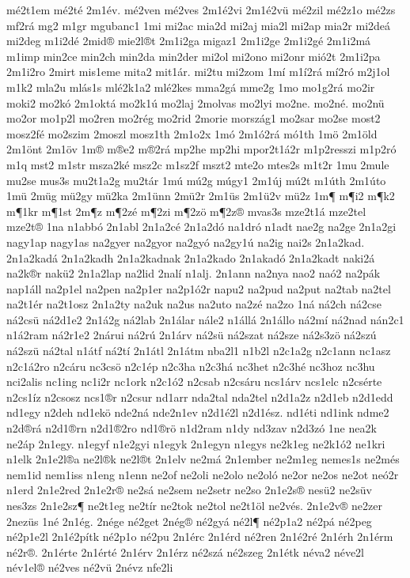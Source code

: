 {mé2t1em
mé2té
2m1év.
mé2ven
mé2ves
2m1é2vi
2m1é2vü
mé2zil
mé2z1o
mé2zs
mf2rá
mg2
m1gr
mgubanc1
1mi
mi2ac
mia2d
mi2aj
mia2l
mi2ap
mia2r
mi2deá
mi2deg
m1i2dé
2mid®
mie2l®t
2m1i2ga
migaz1
2m1i2ge
2m1i2gé
2m1i2má
m1imp
min2ce
min2ch
min2da
min2der
mi2ol
mi2ono
mi2onr
mió2t
2m1i2pa
2m1i2ro
2mirt
mis1eme
mita2
mit1ár.
mi2tu
mi2zom
1mí
m1í2rá
mí2ró
m2j1ol
m1k2
mla2u
mlás1s
mlé2k1a2
mlé2kes
mma2gá
mme2g
1mo
mo1g2rá
mo2ir
moki2
mo2kó
2m1oktá
mo2k1ú
mo2laj
2molvas
mo2lyi
mo2ne.
mo2né.
mo2nü
mo2or
mo1p2l
mo2ren
mo2rég
mo2rid
2morie
mország1
mo2sar
mo2se
most2
mosz2fé
mo2szim
2moszl
mosz1th
2m1o2x
1mó
2m1ó2rá
mó1th
1mö
2m1öld
2m1önt
2m1öv
1m®
m®e2
m®2rá
mp2he
mp2hi
mpor2t1á2r
m1p2resszi
m1p2ró
m1q
mst2
m1str
msza2ké
msz2c
m1sz2f
mszt2
mte2o
mtes2s
m1t2r
1mu
2mule
mu2se
mus3s
mu2t1a2g
mu2tár
1mú
mú2g
múgy1
2m1új
mú2t
m1úth
2m1úto
1mü
2müg
mü2gy
mü2ka
2m1ünn
2mü2r
2m1üs
2m1ü2v
mü2z
1m¶
m¶i2
m¶k2
m¶1kr
m¶1st
2m¶z
m¶2zé
m¶2zi
m¶2zö
m¶2z®
mvas3s
mze2t1á
mze2tel
mze2t®
1na
n1abbó
2n1abl
2n1a2cé
2n1a2dó
na1dró
n1adt
nae2g
na2ge
2n1a2gi
nagy1ap
nagy1as
na2gyer
na2gyor
na2gyó
na2gy1ú
na2ig
nai2s
2n1a2kad.
2n1a2kadá
2n1a2kadh
2n1a2kadnak
2n1a2kado
2n1akadó
2n1a2kadt
naki2á
na2k®r
nakü2
2n1a2lap
na2lid
2nalí
n1alj.
2n1ann
na2nya
nao2
naó2
na2pák
nap1áll
na2p1el
na2pen
na2p1er
na2p1ó2r
napu2
na2pud
na2put
na2tab
na2tel
na2t1ér
na2t1osz
2n1a2ty
na2uk
na2us
na2uto
na2zé
na2zo
1ná
ná2ch
ná2cse
ná2csü
ná2d1e2
2n1á2g
ná2lab
2n1álar
nále2
n1állá
2n1állo
ná2mí
ná2nad
nán2c1
n1á2ram
ná2r1e2
2nárui
ná2rú
2n1árv
ná2sü
ná2szat
ná2sze
ná2s3zö
ná2szú
ná2szü
ná2tal
n1átf
ná2tí
2n1átl
2n1átm
nba2l1
n1b2l
n2c1a2g
n2c1ann
nc1asz
n2c1á2ro
n2cáru
nc3csö
n2c1ép
n2c3ha
n2c3há
nc3het
n2c3hé
nc3hoz
nc3hu
nci2alis
nc1ing
nc1i2r
nc1ork
n2c1ó2
n2csab
n2csáru
ncs1árv
ncs1elc
n2csérte
n2cs1íz
n2csosz
ncs1®r
n2csur
nd1arr
nda2tal
nda2tel
n2d1a2z
n2d1eb
n2d1edd
nd1egy
n2deh
nd1ekö
nde2ná
nde2n1ev
n2d1é2l
n2d1ész.
nd1éti
nd1ink
ndme2
n2d®rá
n2d1®rn
n2d1®2ro
nd1®rö
n1d2ram
n1dy
nd3zav
n2d3zó
1ne
nea2k
ne2áp
2n1egy.
n1egyf
n1e2gyi
n1egyk
2n1egyn
n1egys
ne2k1eg
ne2k1ó2
ne1kri
n1elk
2n1e2l®a
ne2l®k
ne2l®t
2n1elv
ne2má
2n1ember
ne2m1eg
nemes1s
ne2més
nem1id
nem1iss
n1eng
n1enn
ne2of
ne2oli
ne2olo
ne2oló
ne2or
ne2os
ne2ot
neó2r
n1erd
2n1e2red
2n1e2r®
ne2sá
ne2sem
ne2setr
ne2so
2n1e2s®
nesü2
ne2süv
nes3zs
2n1e2sz¶
ne2t1eg
ne2tír
ne2tok
ne2tol
ne2t1öl
ne2vés.
2n1e2v®
ne2zer
2nezüs
1né
2n1ég.
2nége
né2get
2nég®
né2gyá
né2l¶
né2p1a2
né2pá
né2peg
né2p1e2l
2n1é2pítk
né2p1o
né2pu
2n1érc
2n1érd
né2ren
2n1é2ré
2n1érh
2n1érm
né2r®.
2n1érte
2n1érté
2n1érv
2n1érz
né2szá
né2szeg
2n1étk
néva2
néve2l
név1el®
né2ves
né2vü
2névz
nfe2li
}

